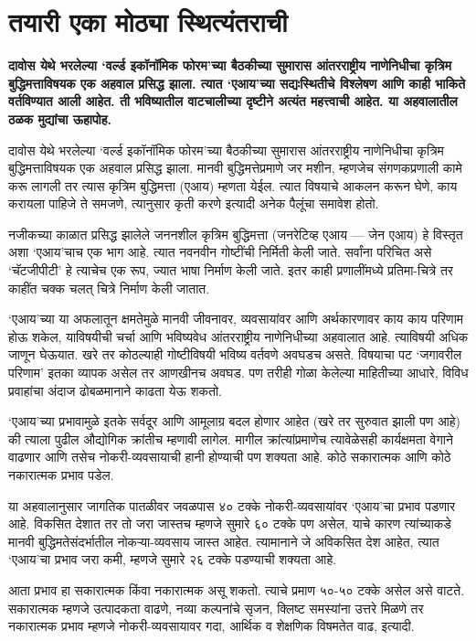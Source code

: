 \chapter{तयारी एका मोठ्या स्थित्यंतराची }

{\textbf{दावोस येथे भरलेल्या ‘वर्ल्ड इकॉनॉमिक फोरम’च्या बैठकीच्या सुमारास आंतरराष्ट्रीय नाणेनिधीचा कृत्रिम बुद्धिमत्ताविषयक एक अहवाल प्रसिद्ध झाला. त्यात ‘एआय’च्या सद्यःस्थितीचे विश्लेषण आणि काही भाकिते वर्तविण्यात आली आहेत. ती भविष्यातील वाटचालीच्या दृष्टीने अत्यंत महत्त्वाची आहेत. या अहवालातील ठळक मुद्यांचा ऊहापोह.}}

दावोस येथे भरलेल्या ‘वर्ल्ड इकॉनॉमिक फोरम’च्या बैठकीच्या सुमारास आंतरराष्ट्रीय नाणेनिधीचा कृत्रिम बुद्धिमत्ताविषयक एक अहवाल प्रसिद्ध झाला. मानवी बुद्धिमत्तेप्रमाणे जर मशीन, म्हणजेच संगणकप्रणाली कामे करू लागली तर त्यास कृत्रिम बुद्धिमत्ता (एआय) म्हणता येईल. त्यात विषयाचे आकलन करून घेणे, काय करायला पाहिजे ते समजणे, त्यानुसार कृती करणे इत्यादी अनेक पैलूंचा समावेश होतो.

नजीकच्या काळात प्रसिद्ध झालेले जननशील कृत्रिम बुद्धिमत्ता (जनरेटिव्ह एआय — जेन एआय) हे विस्तृत अशा ‘एआय’चाच एक भाग आहे. त्यात नवनवीन गोष्टींची निर्मिती केली जाते. सर्वांना परिचित असे ‘चॅटजीपीटी’ हे त्याचेच एक रूप, ज्यात भाषा निर्माण केली जाते. इतर काही प्रणालींमध्ये प्रतिमा-चित्रे तर काहींत चक्क चलत् चित्रे निर्माण केली जातात.

‘एआय’च्या या अफलातून क्षमतेमुळे मानवी जीवनावर, व्यवसायांवर आणि अर्थकारणावर काय काय परिणाम होऊ शकेल, याविषयीची चर्चा आणि भविष्यवेध आंतरराष्ट्रीय नाणेनिधीच्या अहवालात आहे. त्याविषयी अधिक जाणून घेऊयात. खरे तर कोठल्याही गोष्टीविषयी भविष्य वर्तवणे अवघडच असते. विषयाचा पट ‘जगावरील परिणाम’ इतका व्यापक असेल तर आणखीनच अवघड. पण तरीही गोळा केलेल्या माहितीच्या आधारे, विविध प्रवाहांचा अंदाज ढोबळमानाने काढता येऊ शकतो.

‘एआय’च्या प्रभावामुळे इतके सर्वदूर आणि आमूलाग्र बदल होणार आहेत (खरे तर सुरुवात झाली पण आहे) की त्याला पुढील औद्योगिक क्रांतीच म्हणावी लागेल. मागील क्रांत्यांप्रमाणेच त्यावेळेसही कार्यक्षमता वेगाने वाढणार आणि तसेच नोकरी-व्यवसायाची हानी होण्याची पण शक्यता आहे. कोठे सकारात्मक आणि कोठे नकारात्मक प्रभाव पडेल.

या अहवालानुसार जागतिक पातळीवर जवळपास ४० टक्के नोकरी-व्यवसायांवर ‘एआय’चा प्रभाव पडणार आहे. विकसित देशात तर तो जरा जास्तच म्हणजे सुमारे ६० टक्के पण असेल, याचे कारण त्यांच्याकडे मानवी बुद्धिमतेसंदर्भातील नोकऱ्या-व्यवसाय जास्त आहेत. त्यामानाने जे अविकसित देश आहेत, त्यात ‘एआय’चा प्रभाव जरा कमी, म्हणजे सुमारे २६ टक्के पडण्याची शक्यता आहे.

आता प्रभाव हा सकारात्मक किंवा नकारात्मक असू शकतो. त्याचे प्रमाण ५०-५० टक्के असेल असे वाटते. सकारात्मक म्हणजे उत्पादकता वाढणे, नव्या कल्पनांचे सृजन, क्लिष्ट समस्यांना उत्तरे मिळणे तर नकारात्मक प्रभाव म्हणजे नोकरी-व्यवसायावर गदा, आर्थिक व शेक्षणिक विषमतेत वाढ, इत्यादी.

